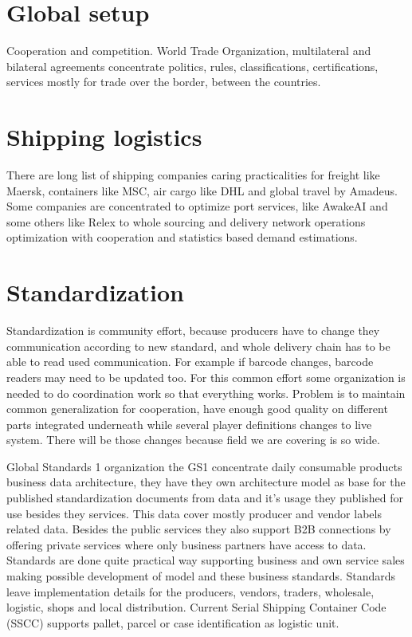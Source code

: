 \section{Global setup}\label{global_setup}
Cooperation and competition. World Trade Organization\allowbreak\cite{WTO},
multilateral\allowbreak\cite{Multilateral} and bilateral\allowbreak\cite{
Bilateral} agreements concentrate politics, rules,
classifications\allowbreak\cite{CPC}\allowbreak\cite{WCO}\allowbreak\cite{
TARIC}, certifications, services\allowbreak\cite{EETS}\allowbreak\cite{AES}
mostly for trade over the border, between the countries\allowbreak\cite{
ListOfCountries}.

\section{Shipping logistics}\label{shipping_logistics}
There are long list of shipping companies caring practicalities for freight
like Maersk\allowbreak\cite{FreightShipping}, containers like
MSC\allowbreak\cite{ContainerShipping}, air cargo like DHL\allowbreak\cite{
CargoAirlines} and global travel by Amadeus\allowbreak\cite{Amadeus}. Some
companies are concentrated to optimize port services, like
AwakeAI\allowbreak\cite{AwakeAI} and some others like
Relex\allowbreak\cite{Relex} to whole sourcing and delivery network
operations optimization with cooperation and statistics based demand
estimations.

\section{Standardization}\label{standardization}
Standardization is community effort, because producers have to change they
communication according to new standard, and whole delivery chain has to be
able to read used communication. For example if barcode changes, barcode
readers may need to be updated too. For this common effort some organization
is needed to do coordination work so that everything works. Problem is to
maintain common generalization for cooperation, have enough good quality
on different parts integrated underneath while several player definitions
changes to live system. There will be those changes because field we are
covering is so wide.

Global Standards 1 organization the GS1\allowbreak\cite{GS1Standards}
concentrate daily consumable products business data architecture, they have
they own architecture model as base for the published standardization
documents from data and it's usage they published for use besides they
services. This data cover mostly producer and vendor labels related data.
Besides the public services they also support B2B connections by offering
private services where only business partners have access to data. Standards
are done quite practical way supporting business and own service sales making
possible development of model and these business standards. Standards leave
implementation details for the producers, vendors, traders, wholesale,
logistic, shops and local distribution. Current Serial Shipping Container
Code (SSCC)\allowbreak\cite{SSCC} supports pallet, parcel or case
identification as logistic unit.

